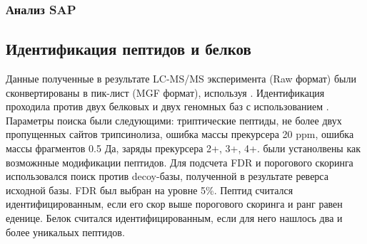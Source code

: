 \subsubsection{Анализ SAP}

\subsection{Идентификация пептидов и белков}
Данные полученные в результате LC-MS/MS эксперимента (Raw формат) были сконвертированы в пик-лист (MGF формат), используя  \cite{chambers2012cross}. Идентификация проходила против двух белковых и двух геномных баз с использованием  \cite{cottrell1999probability}. Параметры поиска были следующими: триптические пептиды, не более двух пропущенных сайтов трипсинолиза, ошибка массы прекурсера 20 ppm, ошибка массы фрагментов 0.5 Да, заряды прекурсера 2+, 3+, 4+.  были устанолвены как возможнные модификации пептидов. Для подсчета FDR и порогового скоринга использовался поиск против decoy-базы, полученной в результате реверса исходной базы. FDR был выбран на уровне 5\%.
Пептид считался идентифицированным, если его скор выше порогового скоринга и ранг равен еденице. Белок считался идентифицированным, если для него нашлось два и более уникальых пептидов.



\newpage

